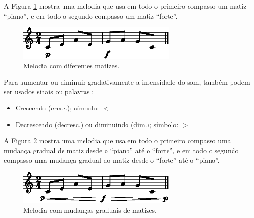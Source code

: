 \begin{example}
A Figura \ref{fig:matiz1-1} mostra uma melodia 
que usa em todo o primeiro compasso um matiz ``piano'',
e em todo o segundo compasso um matiz ``forte''.
\end{example}
\begin{figure}[!h]
\centering
 \includegraphics[width=0.7\textwidth]{chapters/cap-musica-basica/matiz1-1.eps}
\caption{Melodia com diferentes matizes.}
\label{fig:matiz1-1}
\end{figure}

Para aumentar ou diminuir gradativamente a intensidade do som,
também podem ser usados sinais ou palavras \cite[pp. 215]{medteoria} \cite[pp. 117]{mascarenhascurso}:
\begin{itemize}
\item Crescendo (cresc.); símbolo: $<$
\item Decrescendo (decresc.) ou diminuindo (dim.); símbolo: $>$
\end{itemize}

\begin{example}
A Figura \ref{fig:matiz2-1} mostra uma melodia 
que usa em todo o primeiro compasso uma mudança gradual de matiz desde o ``piano'' até o ``forte'',
e em todo o segundo compasso uma mudança gradual do matiz desde o ``forte'' até o ``piano''.
\end{example}
\begin{figure}[!h]
\centering
 \includegraphics[width=0.7\textwidth]{chapters/cap-musica-basica/matiz2-1.eps}
\caption{Melodia com mudanças graduais de matizes.}
\label{fig:matiz2-1}
\end{figure}



